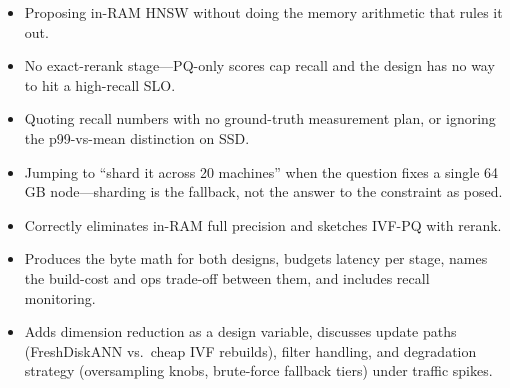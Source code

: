 \begin{interviewq}
\redflags
\begin{itemize}
    \item Proposing in-RAM HNSW without doing the memory arithmetic that rules it out.
    \item No exact-rerank stage---PQ-only scores cap recall and the design has no way to hit a high-recall SLO.
    \item Quoting recall numbers with no ground-truth measurement plan, or ignoring the p99-vs-mean distinction on SSD.
    \item Jumping to ``shard it across 20 machines'' when the question fixes a single 64\,GB node---sharding is the fallback, not the answer to the constraint as posed.
\end{itemize}


\goodgreat
\begin{itemize}
    \item {} Correctly eliminates in-RAM full precision and sketches IVF-PQ with rerank.
    \item {} Produces the byte math for both designs, budgets latency per stage, names the build-cost and ops trade-off between them, and includes recall monitoring.
    \item {} Adds dimension reduction as a design variable, discusses update paths (FreshDiskANN vs.\ cheap IVF rebuilds), filter handling, and degradation strategy (oversampling knobs, brute-force fallback tiers) under traffic spikes.
\end{itemize}

\end{interviewq}


